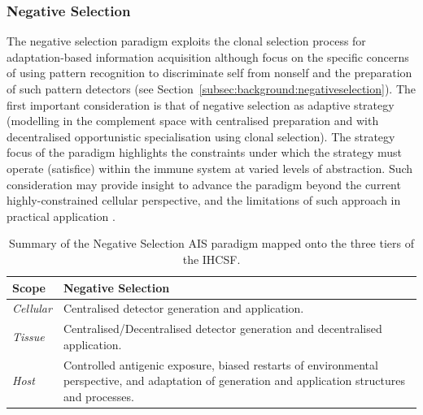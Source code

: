 %
%
\subsubsection{Negative Selection}
The negative selection paradigm exploits the clonal selection process for adaptation-based information acquisition although focus on the specific concerns of using pattern recognition to discriminate self from nonself and the preparation of such pattern detectors (see Section~\ref{subsec:background:negativeselection}).
The first important consideration is that of negative selection as adaptive strategy (modelling in the complement space with centralised preparation and with decentralised opportunistic specialisation using clonal selection). The strategy focus of the paradigm highlights the constraints under which the strategy must operate (satisfice) within the immune system at varied levels of abstraction. Such consideration may provide insight to advance the paradigm beyond the current highly-constrained cellular perspective, and the limitations of such approach in practical application \cite{Stibor2006}. 

\begin{table}[htp]
	\centering\small
		\begin{tabularx}{\textwidth}{lX}
		\toprule
		\textbf{Scope} & \textbf{Negative Selection} \\ 
		\toprule
		\emph{Cellular} & Centralised detector generation and application. \\ 
		\midrule
		\emph{Tissue} & Centralised/Decentralised detector generation and decentralised application.\\ 
		\midrule
		\emph{Host} & Controlled antigenic exposure, biased restarts of environmental perspective, and adaptation of generation and application structures and processes. \\ 
		\bottomrule
		\end{tabularx}
	\caption{Summary of the Negative Selection AIS paradigm mapped onto the three tiers of the IHCSF.}
	\label{tab:framework:ais:negativeselection}
\end{table}

